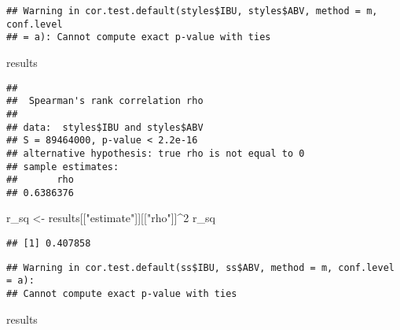 \documentclass[]{article}
\newenvironment{Shaded}{\begin{snugshade}}{\end{snugshade}}
\newcommand{\KeywordTok}[1]{\textcolor[rgb]{0.13,0.29,0.53}{\textbf{#1}}}
\newcommand{\DataTypeTok}[1]{\textcolor[rgb]{0.13,0.29,0.53}{#1}}
\newcommand{\DecValTok}[1]{\textcolor[rgb]{0.00,0.00,0.81}{#1}}
\newcommand{\StringTok}[1]{\textcolor[rgb]{0.31,0.60,0.02}{#1}}
\newcommand{\CommentTok}[1]{\textcolor[rgb]{0.56,0.35,0.01}{\textit{#1}}}
\newcommand{\OperatorTok}[1]{\textcolor[rgb]{0.81,0.36,0.00}{\textbf{#1}}}
\newcommand{\NormalTok}[1]{#1}
\begin{document}
\begin{verbatim}
## Warning in cor.test.default(styles$IBU, styles$ABV, method = m, conf.level
## = a): Cannot compute exact p-value with ties
\end{verbatim}

\begin{Shaded}
\begin{Highlighting}[]
\NormalTok{results}
\end{Highlighting}
\end{Shaded}

\begin{verbatim}
## 
##  Spearman's rank correlation rho
## 
## data:  styles$IBU and styles$ABV
## S = 89464000, p-value < 2.2e-16
## alternative hypothesis: true rho is not equal to 0
## sample estimates:
##       rho 
## 0.6386376
\end{verbatim}

\begin{Shaded}
\begin{Highlighting}[]
\NormalTok{r_sq <-}\StringTok{ }\NormalTok{results[[}\StringTok{"estimate"}\NormalTok{]][[}\StringTok{"rho"}\NormalTok{]]}\OperatorTok{^}\DecValTok{2}
\NormalTok{r_sq}
\end{Highlighting}
\end{Shaded}

\begin{verbatim}
## [1] 0.407858
\end{verbatim}

\begin{Shaded}
\end{Shaded}

\begin{verbatim}
## Warning in cor.test.default(ss$IBU, ss$ABV, method = m, conf.level = a):
## Cannot compute exact p-value with ties
\end{verbatim}

\begin{Shaded}
\begin{Highlighting}[]
\NormalTok{results}
\end{Highlighting}
\end{Shaded}
\end{document}
